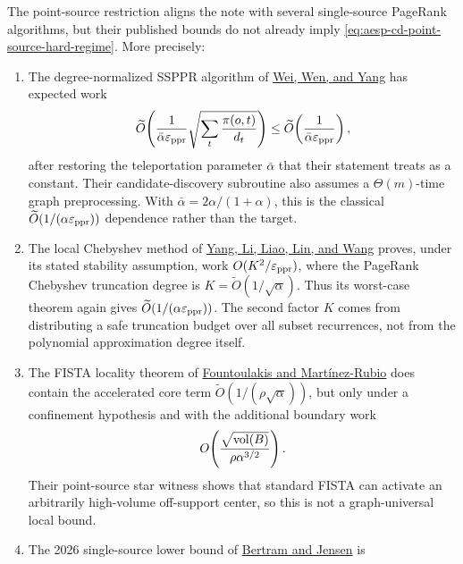 \begin{proposition}
\label{prop:aesp-cd-point-source-existing-hard-regime}
The point-source restriction aligns the note with several single-source
PageRank algorithms, but their published bounds do not already imply
\cref{eq:aesp-cd-point-source-hard-regime}.  More precisely:
\begin{enumerate}
\item The degree-normalized SSPPR algorithm of
  \href{https://doi.org/10.4230/LIPIcs.ICDT.2024.9}{Wei, Wen, and Yang}
  has expected work
  \begin{equation*}
   \widetilde O\!\left(
    \frac1{\bar\alpha\varepsilon_{\mathrm{ppr}}}
    \sqrt{\sum_t\frac{\pi(o,t)}{d_t}}
   \right)
   \leq \widetilde O\!\left(
    \frac1{\bar\alpha\varepsilon_{\mathrm{ppr}}}
   \right),
  \end{equation*}
  after restoring the teleportation parameter \(\bar\alpha\) that their
  statement treats as a constant.  Their candidate-discovery subroutine
  also assumes a \(\Theta(m)\)-time graph preprocessing.  With
  \(\bar\alpha=2\alpha/(1+\alpha)\), this is the classical
  \(\widetilde O(1/(\alpha\varepsilon_{\mathrm{ppr}}))\) dependence rather than the target.
\item The local Chebyshev method of
  \href{https://arxiv.org/abs/2412.10789}{Yang, Li, Liao, Lin, and Wang}
  proves, under its stated stability assumption, work
  \(O(K^2/\varepsilon_{\mathrm{ppr}})\), where the PageRank Chebyshev truncation degree is
  \(K=\widetilde O(1/\sqrt\alpha)\).  Thus its worst-case theorem again
  gives \(\widetilde O(1/(\alpha\varepsilon_{\mathrm{ppr}}))\).  The second factor \(K\)
  comes from distributing a safe truncation budget over all subset
  recurrences, not from the polynomial approximation degree itself.
\item The FISTA locality theorem of
  \href{https://arxiv.org/abs/2602.21138}{Fountoulakis and
  Mart\'inez-Rubio} does contain the accelerated core term
  \(\widetilde O(1/(\rho\sqrt\alpha))\), but only under a confinement
  hypothesis and with the additional boundary work
  \begin{equation*}
   O\!\left(\frac{\sqrt{\operatorname{vol}(B)}}{\rho\alpha^{3/2}}\right).
  \end{equation*}
  Their point-source star witness shows that standard FISTA can activate
  an arbitrarily high-volume off-support center, so this is not a
  graph-universal local bound.
\item The 2026 single-source lower bound of
  \href{https://arxiv.org/abs/2602.10843}{Bertram and Jensen} is

\end{enumerate}
\end{proposition}
